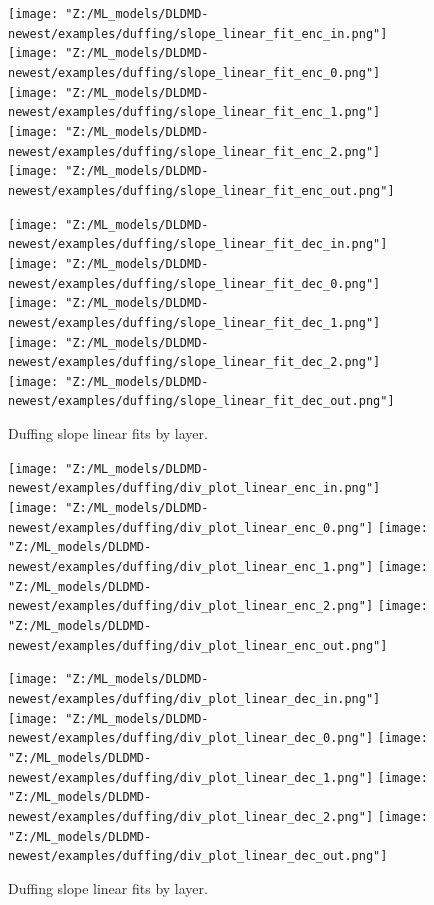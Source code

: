 \begin{figure}[h!p]
    \centering
    \begin{minipage}{.5\textwidth}
        \texttt{[image: "Z:/ML\_models/DLDMD-newest/examples/duffing/slope\_linear\_fit\_enc\_in.png"]} 
        \texttt{[image: "Z:/ML\_models/DLDMD-newest/examples/duffing/slope\_linear\_fit\_enc\_0.png"]} 
        \texttt{[image: "Z:/ML\_models/DLDMD-newest/examples/duffing/slope\_linear\_fit\_enc\_1.png"]} 
        \texttt{[image: "Z:/ML\_models/DLDMD-newest/examples/duffing/slope\_linear\_fit\_enc\_2.png"]} 
        \texttt{[image: "Z:/ML\_models/DLDMD-newest/examples/duffing/slope\_linear\_fit\_enc\_out.png"]} 
    \end{minipage}%
    \begin{minipage}{.5\textwidth}
        \texttt{[image: "Z:/ML\_models/DLDMD-newest/examples/duffing/slope\_linear\_fit\_dec\_in.png"]} 
        \texttt{[image: "Z:/ML\_models/DLDMD-newest/examples/duffing/slope\_linear\_fit\_dec\_0.png"]} 
        \texttt{[image: "Z:/ML\_models/DLDMD-newest/examples/duffing/slope\_linear\_fit\_dec\_1.png"]} 
        \texttt{[image: "Z:/ML\_models/DLDMD-newest/examples/duffing/slope\_linear\_fit\_dec\_2.png"]} 
        \texttt{[image: "Z:/ML\_models/DLDMD-newest/examples/duffing/slope\_linear\_fit\_dec\_out.png"]} 
    \end{minipage}
    \caption{Duffing slope linear fits by layer.}
    \label{fig:duffing slopes all layers}
\end{figure}

\begin{figure}[h!p]
    \centering
    \begin{minipage}{.5\textwidth}
        \texttt{[image: "Z:/ML\_models/DLDMD-newest/examples/duffing/div\_plot\_linear\_enc\_in.png"]} 
        \texttt{[image: "Z:/ML\_models/DLDMD-newest/examples/duffing/div\_plot\_linear\_enc\_0.png"]} 
        \texttt{[image: "Z:/ML\_models/DLDMD-newest/examples/duffing/div\_plot\_linear\_enc\_1.png"]} 
        \texttt{[image: "Z:/ML\_models/DLDMD-newest/examples/duffing/div\_plot\_linear\_enc\_2.png"]} 
        \texttt{[image: "Z:/ML\_models/DLDMD-newest/examples/duffing/div\_plot\_linear\_enc\_out.png"]} 
    \end{minipage}%
    \begin{minipage}{.5\textwidth}
        \texttt{[image: "Z:/ML\_models/DLDMD-newest/examples/duffing/div\_plot\_linear\_dec\_in.png"]} 
        \texttt{[image: "Z:/ML\_models/DLDMD-newest/examples/duffing/div\_plot\_linear\_dec\_0.png"]} 
        \texttt{[image: "Z:/ML\_models/DLDMD-newest/examples/duffing/div\_plot\_linear\_dec\_1.png"]} 
        \texttt{[image: "Z:/ML\_models/DLDMD-newest/examples/duffing/div\_plot\_linear\_dec\_2.png"]} 
        \texttt{[image: "Z:/ML\_models/DLDMD-newest/examples/duffing/div\_plot\_linear\_dec\_out.png"]} 
    \end{minipage}
    \caption{Duffing slope linear fits by layer.}
    \label{fig:duffing linear fits all layers}
\end{figure}

